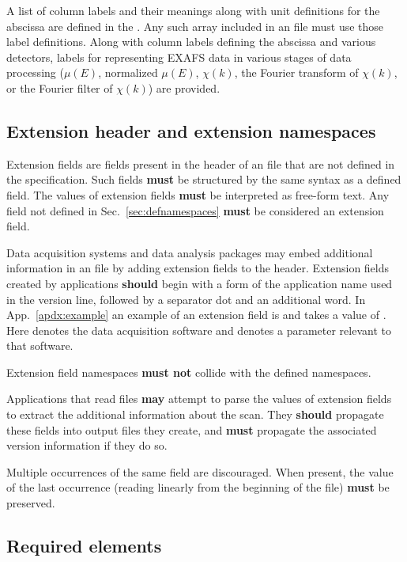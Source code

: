 \documentclass{article}
\begin{document}
A list of column labels and their meanings along with unit definitions
for the abscissa are defined in the {\DMD}.  Any such array included
in an {\xdi} file must use those label definitions.  Along with column
labels defining the abscissa and various detectors, labels for
representing EXAFS data in various stages of data processing
($\mu(E)$, normalized $\mu(E)$, $\chi(k)$, the Fourier transform of
$\chi(k)$, or the Fourier filter of $\chi(k)$) are provided.

\subsection{Extension header and extension namespaces}
\label{sec:extension}

Extension fields are fields present in the header of an {\xdi} file
that are not defined in the {\xdi} specification.  Such fields
\textbf{must} be structured by the same syntax as a defined field.
The values of extension fields \textbf{must} be interpreted as
free-form text.  Any field not defined in Sec.~\ref{sec:defnamespaces}
\textbf{must} be considered an extension field.


Data acquisition systems and data analysis packages may embed
additional information in an {\xdi} file by adding extension fields to
the header.  Extension fields created by applications \textbf{should}
begin with a form of the application name used in the version line,
followed by a separator dot and an additional word.  In
App.~\ref{apdx:example} an example of an extension field is
 and takes a value of .  Here
 denotes the data acquisition software and 
denotes a parameter relevant to that software.

Extension field namespaces \textbf{must not} collide with the defined
namespaces.

Applications that read {\xdi} files \textbf{may} attempt to parse the
values of extension fields to extract the additional information about
the scan.  They \textbf{should} propagate these fields into output
files they create, and \textbf{must} propagate the associated version
information if they do so.

Multiple occurrences of the same field are discouraged.  When present,
the value of the last occurrence (reading linearly from the beginning
of the file) \textbf{must} be preserved.

\subsection{Required elements}
\label{sec:requiredelements}
\end{document}
